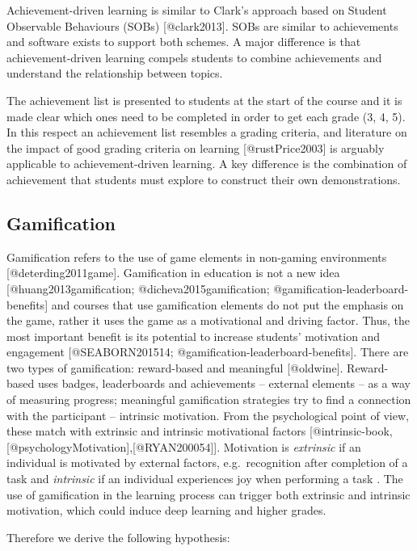 \documentclass[
]{article}
\begin{document}
Achievement-driven learning is similar to Clark's approach based on
Student Observable Behaviours (SOBs) {[}@clark2013{]}. SOBs are similar
to achievements and software exists to support both schemes. A major
difference is that achievement-driven learning compels students to
combine achievements and understand the relationship between topics.

The achievement list is presented to students at the start of the course
and it is made clear which ones need to be completed in order to get
each grade (3, 4, 5). In this respect an achievement list resembles a
grading criteria, and literature on the impact of good grading criteria
on learning {[}@rustPrice2003{]} is arguably applicable to
achievement-driven learning. A key difference is the combination of
achievement that students must explore to construct their own
demonstrations.

\hypertarget{gamification}{%
\subsection{Gamification}\label{gamification}}

Gamification refers to the use of game elements in non-gaming
environments {[}@deterding2011game{]}. Gamification in education is not
a new idea {[}@huang2013gamification; @dicheva2015gamification;
@gamification-leaderboard-benefits{]} and courses that use gamification
elements do not put the emphasis on the game, rather it uses the game as
a motivational and driving factor. Thus, the most important benefit is
its potential to increase students' motivation and engagement
{[}@SEABORN201514; @gamification-leaderboard-benefits{]}. There are two
types of gamification: reward-based and meaningful {[}@oldwine{]}.
Reward-based uses badges, leaderboards and achievements -- external
elements -- as a way of measuring progress; meaningful gamification
strategies try to find a connection with the participant -- intrinsic
motivation. From the psychological point of view, these match with
extrinsic and intrinsic motivational factors
{[}@intrinsic-book,{[}@psychologyMotivation{]},{[}@RYAN200054{]}{]}.
Motivation is \textit{extrinsic} if an individual is motivated by
external factors, e.g.~recognition after completion of a task and
\textit{intrinsic} if an individual experiences joy when performing a
task . The use of gamification in the learning process can trigger both
extrinsic and intrinsic motivation, which could induce deep learning and
higher grades.

Therefore we derive the following hypothesis:
\end{document}
